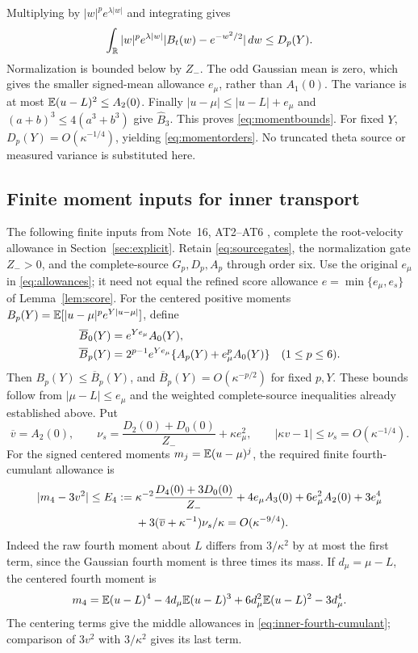 Multiplying by $|w|^pe^{\lambda|w|}$ and integrating gives
\[
 \int_\mathbb R |w|^pe^{\lambda|w|}
             |B_t(w)-e^{-w^2/2}|\,dw\le D_p(Y).
\]
Normalization is bounded below by $Z_-$.
The odd Gaussian mean is zero, which gives the smaller signed-mean
allowance $e_\mu$, rather than $A_1(0)$.
The variance is at most $\mathbb E(u-L)^2\le A_2(0)$.
Finally $|u-\mu|\le|u-L|+e_\mu$ and
$(a+b)^3\le4(a^3+b^3)$ give $\widehat B_3$.
This proves \eqref{eq:momentbounds}. For fixed $Y$,
$D_p(Y)=O(\kappa^{-1/4})$, yielding \eqref{eq:momentorders}.
No truncated theta source or measured variance is substituted here.


\subsection{Finite moment inputs for inner transport}
\label{app:inner-transport-allowances}
The following finite inputs from Note~16, AT2--AT6 \cite{n16}, complete
the root-velocity allowance in Section~\ref{sec:explicit}. Retain
\eqref{eq:sourcegates}, the normalization gate $Z_->0$, and the
complete-source $G_p,D_p,A_p$ through order six. Use the original
$e_\mu$ in \eqref{eq:allowances}; it need not equal the refined score
allowance $e=\min\{e_\mu,e_s\}$ of Lemma~\ref{lem:score}.
For the centered positive moments
$B_p(Y)=\mathbb E[|u-\mu|^pe^{Y|u-\mu|}]$, define
\begin{align}
 \overline B_0(Y)&=e^{Ye_\mu}A_0(Y),\notag\\
 \overline B_p(Y)&=2^{p-1}e^{Ye_\mu}
             \{A_p(Y)+e_\mu^pA_0(Y)\}\quad(1\le p\le6).
 \label{eq:inner-positive-moments}
\end{align}
Then $B_p(Y)\le\overline B_p(Y)$, and
$\overline B_p(Y)=O(\kappa^{-p/2})$ for fixed $p,Y$.
These bounds follow from $|\mu-L|\le e_\mu$ and the weighted
complete-source inequalities already established above.
Put
\begin{equation}
 \overline v=A_2(0),\qquad
 \nu_s=\frac{D_2(0)+D_0(0)}{Z_-}+\kappa e_\mu^2,
 \qquad |\kappa v-1|\le\nu_s=O(\kappa^{-1/4}).
 \label{eq:inner-variance-allowance}
\end{equation}
For the signed centered moments $m_j=\mathbb E(u-\mu)^j$, the required finite
fourth-cumulant allowance is
\begin{align}
 |m_4-3v^2|\le E_4:={}&
 \kappa^{-2}\frac{D_4(0)+3D_0(0)}{Z_-}
 +4e_\mu A_3(0)+6e_\mu^2A_2(0)+3e_\mu^4\notag\\
 &+3(\overline v+\kappa^{-1})\nu_s/\kappa
 =O(\kappa^{-9/4}).
 \label{eq:inner-fourth-cumulant}
\end{align}
Indeed the raw fourth moment about $L$ differs from $3/\kappa^2$
by at most the first term, since the Gaussian fourth moment is three
times its mass. If $d_\mu=\mu-L$, the centered fourth moment is
\[
 m_4=\mathbb E(u-L)^4-4d_\mu\mathbb E(u-L)^3
                   +6d_\mu^2\mathbb E(u-L)^2-3d_\mu^4.
\]
The centering terms give the middle allowances in
\eqref{eq:inner-fourth-cumulant}; comparison of $3v^2$ with
$3/\kappa^2$ gives its last term.

